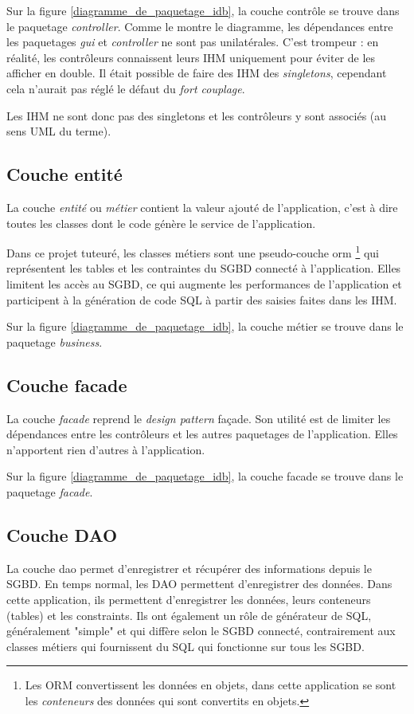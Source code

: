 Sur la figure \ref{diagramme_de_paquetage_idb}, la couche contrôle se trouve dans le paquetage \textit{controller}.
Comme le montre le diagramme, les dépendances entre les paquetages \textit{gui} et \textit{controller} ne sont pas unilatérales.
C'est trompeur : en réalité, les contrôleurs connaissent leurs IHM uniquement pour éviter de les afficher en double.
Il était possible de faire des IHM des \textit{singletons}, cependant cela n'aurait pas réglé le défaut du \textit{fort couplage}.

Les IHM ne sont donc pas des singletons et les contrôleurs y sont associés (au sens UML du terme).

\subsection{Couche entité}
La couche \textit{entité} ou \textit{métier} contient la valeur ajouté de l'application, c'est à dire toutes les classes dont le code génère le service de l'application.

Dans ce projet tuteuré, les classes métiers sont une pseudo-couche \gls{orm}
\footnote{\label{faux_orm}Les ORM convertissent les données en objets, dans cette application se sont les \textit{conteneurs} des données qui sont convertits en objets.}
qui représentent les tables et les contraintes du SGBD connecté à l'application.
Elles limitent les accès au SGBD, ce qui augmente les performances de l'application et participent à la génération de code SQL à partir des saisies faites dans les IHM.

Sur la figure \ref{diagramme_de_paquetage_idb}, la couche métier se trouve dans le paquetage \textit{business}.

\subsection{Couche facade}
La couche \textit{facade} reprend le \textit{design pattern} façade.
Son utilité est de limiter les dépendances entre les contrôleurs et les autres paquetages de l'application.
Elles n'apportent rien d'autres à l'application.

Sur la figure \ref{diagramme_de_paquetage_idb}, la couche facade se trouve dans le paquetage \textit{facade}.

\subsection{Couche DAO}
La couche \gls{dao} permet d'enregistrer et récupérer des informations depuis le SGBD.
En temps normal, les DAO permettent d'enregistrer des données.
Dans cette application, ils permettent d'enregistrer les données, leurs conteneurs (tables) et les \glspl{constraint}.
Ils ont également un rôle de générateur de SQL, généralement "simple" et qui diffère selon le SGBD connecté, contrairement aux classes métiers qui fournissent du SQL qui fonctionne sur tous les SGBD.

